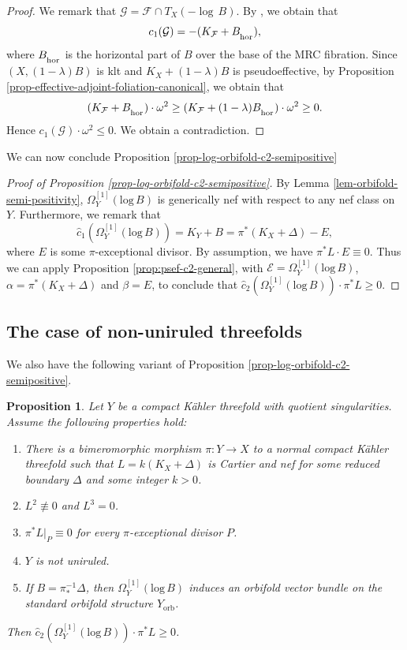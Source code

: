 \documentclass[12pt]{amsart}
\newcommand{\<}{\leq}
\def\>{\geq}
\newcommand{\num}{\equiv}
\newcommand{\D}{\Delta}
\def\mcE{\mathcal{E}}
\def\mcF{\mathcal{F}}
\def\mcG{\mathcal{G}}
\newtheorem{proposition}[theorem]{Proposition}
\theoremstyle{remark}
\theoremstyle{definition}
\theoremstyle{definition}
\numberwithin{equation}{section}
\theoremstyle{definition}
\theoremstyle{definition}
\def\hor{\operatorname{\hor}}
\def\orb{\mathrm{orb}}
\def\hor{\operatorname{\textsubscript{\rm hor}}}
\begin{document}
\begin{proof}
We remark that  $\mcG = \mcF \cap  T_{X}(-\log\, B)$. 
By \cite[Proposition 2.17]{Cla17}, we obtain that 
\[ 
c_1(\mcG) = -(K_{\mcF} + B_{\hor}), 
\] 
where $B_{\hor}$ is the  horizontal part of $B$ over the base of the MRC fibration.  
Since $(X, (1-\lambda) B)$ is klt and $K_{X}+(1-\lambda) B$ is pseudoeffective, 
by Proposition \ref{prop-effective-adjoint-foliation-canonical}, we obtain that 
\[
(K_{\mcF}+B_{\hor} )\cdot  \omega^2 \> (K_{\mcF}+ (1-\lambda)  {B}_{\hor}) \cdot  \omega^2 \> 0. 
\] 
Hence $c_1(\mcG) \cdot  \omega^2 \< 0$. We obtain a contradiction.
\end{proof}


We can now conclude Proposition \ref{prop-log-orbifold-c2-semipositive}


\begin{proof}[{Proof of Proposition \ref{prop-log-orbifold-c2-semipositive}}]
By Lemma \ref{lem-orbifold-semi-positivity}, $\Omega_{Y}^{[1]}(\mathrm{log}\, B)$ is  generically nef with respect to any nef class on $Y$. 
Furthermore, we remark that 
\[
\hat{c}_1(\Omega_{Y}^{[1]}(\mathrm{log}\, B)) = K_Y+B = \pi^*(K_X+\Delta) - E,
\]
where $E$ is some $\pi$-exceptional divisor.  
By assumption, we have $\pi^*L\cdot E\num 0$. 
Thus we can apply Proposition \ref{prop:psef-c2-general}, with $\mcE= \Omega_{Y}^{[1]}(\mathrm{log}\, B)$,  $\alpha=   \pi^*(K_X+\D)$ and $\beta=E$, 
 to conclude that  $\hat{c}_2(\Omega_{Y}^{[1]}(\mathrm{log}\, B)) \cdot \pi^*L \> 0$.  
\end{proof}



\subsection{The case of non-uniruled threefolds} 
 
We also have  the following variant of Proposition \ref{prop-log-orbifold-c2-semipositive}.

\begin{proposition}
\label{prop:psef-c2}
Let $Y$ be a   compact K\"ahler threefold with quotient singularities.
Assume the   following properties hold:
\begin{enumerate}
    \item There is a bimeromorphic morphism $\pi\colon Y \to X$ to a normal compact K\"ahler threefold  such that $L=k(K_X+\D)$ is Cartier and nef for some  reduced boundary $\D$ and some integer $k>0$. 
    \item $L^2\not\equiv 0$ and $L^3 = 0$. 
    \item  $\pi^*L|_P \equiv 0$ for every $\pi$-exceptional divisor $P$. 
    \item $Y$ is not uniruled. 
    \item  If  $B=\pi_*^{-1}\D$, then $\Omega_Y^{[1]}(\mathrm{log}\,  B)$ induces an orbifold vector bundle on the standard orbifold structure $Y_{\orb}$. 
\end{enumerate} 
Then  $\hat{c}_2(\Omega_Y^{[1]}(\mathrm{log}\,  B)) \cdot  \pi^*L \> 0$.   
\end{proposition}
\end{document}
